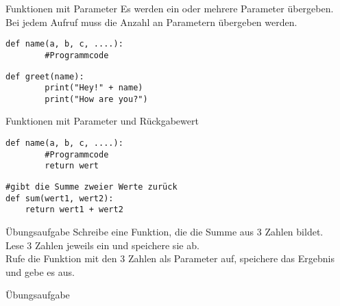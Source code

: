 \begin{frame}[fragile]{Funktionen mit Parameter}
Es werden ein oder mehrere Parameter übergeben. \\
Bei jedem Aufruf muss die Anzahl an Parametern übergeben werden.
\begin{lstlisting}
def name(a, b, c, ....):
		#Programmcode
\end{lstlisting}

\begin{lstlisting}
def greet(name):
		print("Hey!" + name)
		print("How are you?")
\end{lstlisting}
\end{frame}


\begin{frame}[fragile]{Funktionen mit Parameter und Rückgabewert}

\begin{lstlisting}
def name(a, b, c, ....):
		#Programmcode
		return wert
\end{lstlisting}

\begin{lstlisting}
#gibt die Summe zweier Werte zurück
def sum(wert1, wert2):
	return wert1 + wert2	
\end{lstlisting}
\end{frame}

\begin{frame}[fragile]{Übungsaufgabe}
Schreibe eine Funktion, die die Summe aus 3 Zahlen bildet.\\
Lese 3 Zahlen jeweils ein und speichere sie ab.\\
Rufe die Funktion mit den 3 Zahlen als Parameter auf, speichere das Ergebnis und gebe es aus.

\end{frame}


\begin{frame}[fragile]{Übungsaufgabe}


\end{frame}







